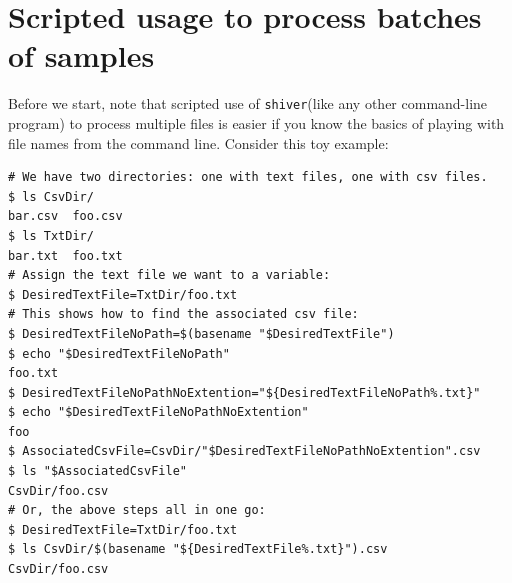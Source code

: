 \documentclass{article}
\newcommand{\shiv}{\c{shiver}\xspace}
\let\c\texttt
\begin{document}
\section{Scripted usage to process batches of samples} \label{sec:scripting}
Before we start, note that scripted use of \shiv (like any other command-line program) to process multiple files is easier if you know the basics of playing with file names from the command line.
Consider this toy example:
\begin{Verbatim}[samepage=true]
# We have two directories: one with text files, one with csv files.
$ ls CsvDir/
bar.csv  foo.csv
$ ls TxtDir/
bar.txt  foo.txt
# Assign the text file we want to a variable:
$ DesiredTextFile=TxtDir/foo.txt
# This shows how to find the associated csv file:
$ DesiredTextFileNoPath=$(basename "$DesiredTextFile")
$ echo "$DesiredTextFileNoPath"
foo.txt
$ DesiredTextFileNoPathNoExtention="${DesiredTextFileNoPath%.txt}"
$ echo "$DesiredTextFileNoPathNoExtention"
foo
$ AssociatedCsvFile=CsvDir/"$DesiredTextFileNoPathNoExtention".csv
$ ls "$AssociatedCsvFile"
CsvDir/foo.csv
# Or, the above steps all in one go:
$ DesiredTextFile=TxtDir/foo.txt
$ ls CsvDir/$(basename "${DesiredTextFile%.txt}").csv
CsvDir/foo.csv
\end{Verbatim}
\end{document}
